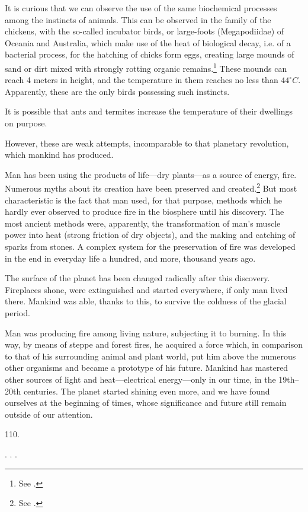 It is curious that we can observe the use of the same biochemical processes
among the instincts of animals.  This can be observed in the family of the
chickens, with the so-called incubator birds, or large-foots (Megapodiidae) of
Oceania and Australia, which make use of the heat of biological decay, i.e. of
a bacterial process, for the hatching of chicks form eggs, creating large
mounds of sand or dirt mixed with strongly rotting organic
remains.\footnote{
	See \foreignlanguage{russian}{\cite{brem1912zhizn-ptitsy}}.
}  These mounds can reach 4 meters in height, and the temperature in them
reaches no less than ${44}^\circ C$.  Apparently, these are the only birds
possessing such instincts.

It is possible that ants and termites increase the temperature of their
dwellings on purpose.

However, these are weak attempts, incomparable to that planetary revolution,
which mankind has produced.

Man has been using the products of life---dry plants---as a source of energy,
fire.  Numerous myths about its creation have been preserved and
created.\footnote{See \cite{frazer1930myths}.}  But most characteristic is the
fact that man used, for that purpose, methods which he hardly ever observed to
produce fire in the biosphere until his discovery.  The most ancient methods
were, apparently, the transformation of man's muscle power into heat (strong
friction of dry objects), and the making and catching of sparks from stones.  A
complex system for the preservation of fire was developed in the end in
everyday life a hundred, and more, thousand years ago.

The surface of the planet has been changed radically after this discovery.
Fireplaces shone, were extinguished and started everywhere, if only man lived
there.  Mankind was able, thanks to this, to survive the coldness of the
glacial period.

Man was producing fire among living nature, subjecting it to burning.  In this
way, by means of steppe and forest fires, he acquired a force which, in
comparison to that of his surrounding animal and plant world, put him above
the numerous other organisms and became a prototype of his future. Mankind has
mastered other sources of light and heat---electrical energy---only in our
time, in the 19th--20th centuries.  The planet started shining even more, and
we have found ourselves at the beginning of times, whose significance and
future still remain outside of our attention.


110. 


. . .


